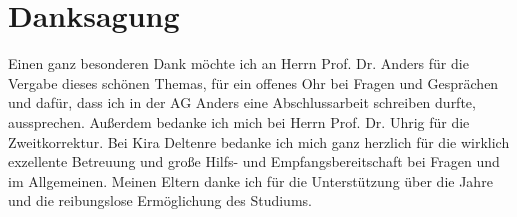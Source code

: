 \newpage
\thispagestyle{empty}
\section*{Danksagung}
Einen ganz besonderen Dank möchte ich an Herrn Prof. Dr. Anders für die Vergabe dieses schönen Themas, für ein offenes Ohr 
bei Fragen und Gesprächen und dafür, dass ich in der AG Anders eine Abschlussarbeit schreiben durfte, aussprechen.
Außerdem bedanke ich mich bei Herrn Prof. Dr. Uhrig für die Zweitkorrektur.
Bei Kira Deltenre bedanke ich mich ganz herzlich für die wirklich exzellente Betreuung und große Hilfs- und Empfangsbereitschaft 
bei Fragen und im Allgemeinen.
Meinen Eltern danke ich für die Unterstützung über die Jahre und die reibungslose Ermöglichung des Studiums. 